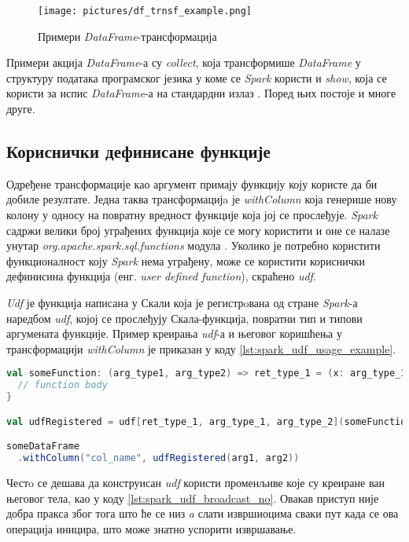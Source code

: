 \documentclass[12pt,oneside]{memoir}
\begin{document}
\begin{figure}[!ht]
  \centering
  \texttt{[image: pictures/df\_trnsf\_example.png]}
  \caption{Примери \textit{DataFrame}-трансформација}
  \label{fig:sprk_df_trnsf_example}
\end{figure}

Примери акција \textit{DataFrame}-а су \textit{collect}, која трансформише \textit{DataFrame} у структуру података програмског језика у коме се \textit{Spark} користи и \textit{show}, која се користи за испис \textit{DataFrame}-а на стандардни излаз \cite{spark_guide}. Поред њих постоје и многе друге.

\subsection{Кориснички дефинисане функције}
\label{subsec:spark_udf_section}

Одређене трансформације као аргумент примају функцију коју користе да би добиле резултате. Једна таква трансформацијa је \textit{withColumn} која генерише нову колону у односу на повратну вредност функције која јој се прослеђује. \textit{Spark} садржи велики број уграђених функција које се могу користити и оне се налазе унутар \textit{org.apache.spark.sql.functions} модула \cite{spark_builtin_func}. Уколико је потребно користити функционалност коју \textit{Spark} нема уграђену, може се користити кориснички дефинисина функција (енг. \textit{user defined function}), скраћено \textit{udf}.

\textit{Udf} је функција написана у Скали која је регистрoвана од стране \textit{Spark}-а наредбом \textit{udf}, којој се прослеђују Скала-функција, повратни тип и типови аргумената функције. Пример креирања \textit{udf}-а и његовог коришћења у трансформацији \textit{withColumn} је приказан у коду \ref{lst:spark_udf_usage_example}.

\begin{lstlisting}[caption={Пример коришћења \textit{udf}-а}, language=Scala, label={lst:spark_udf_usage_example}]
val someFunction: (arg_type1, arg_type2) => ret_type_1 = (x: arg_type_1, y: arg_type_2) => {
  // function body
}

val udfRegistered = udf[ret_type_1, arg_type_1, arg_type_2](someFunction)

someDataFrame
  .withColumn("col_name", udfRegistered(arg1, arg2)) 
\end{lstlisting}

Честo се дешава да конструисан \textit{udf} користи променљиве које су креиране ван његовог тела, као у коду \ref{lst:spark_udf_broadcast_no}. Овакав приступ није добра пракса због тога што ће се низ \textit{a} слати извршиоцима сваки пут када се ова операција иницира, што може знатно успорити извршавање.
\end{document}
